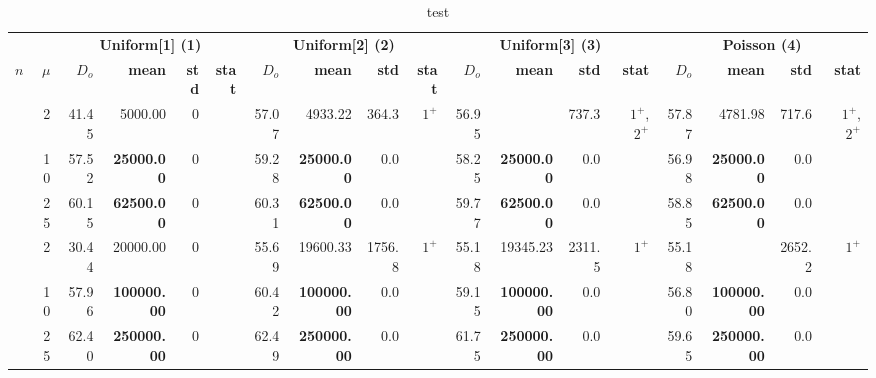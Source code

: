 \begin{table}

\caption{test}
\centering
\begin{tabular}[t]{rrrrrrrrrrrrrrrrrr}
\toprule
\multicolumn{1}{c}{\textbf{ }} & \multicolumn{1}{c}{\textbf{ }} & \multicolumn{4}{c}{\textbf{Uniform[1] (1)}} & \multicolumn{4}{c}{\textbf{Uniform[2] (2)}} & \multicolumn{4}{c}{\textbf{Uniform[3] (3)}} & \multicolumn{4}{c}{\textbf{Poisson (4)}} \\
\cmidrule(l{3pt}r{3pt}){3-6} \cmidrule(l{3pt}r{3pt}){7-10} \cmidrule(l{3pt}r{3pt}){11-14} \cmidrule(l{3pt}r{3pt}){15-18}
$n$ & $\mu$ & $D_o$ & \textbf{mean} & \textbf{std} & \textbf{stat} & $D_o$ & \textbf{mean} & \textbf{std} & \textbf{stat} & $D_o$ & \textbf{mean} & \textbf{std} & \textbf{stat} & $D_o$ & \textbf{mean} & \textbf{std} & \textbf{stat}\\
\midrule
 & 2 & 41.45 & 5000.00 & 0 &  & 57.07 & 4933.22 & 364.3 & \textcolor{uniform1}{$\text{1}^{+}$} & 56.95 & \cellcolor{gray!20}{\textbf{4778.68}} & 737.3 & \textcolor{uniform1}{$\text{1}^{+}$}, \textcolor{uniform2}{$\text{2}^{+}$} & 57.87 & 4781.98 & 717.6 & \textcolor{uniform1}{$\text{1}^{+}$}, \textcolor{uniform2}{$\text{2}^{+}$}\\

 & 10 & 57.52 & \textbf{25000.00} & 0 &  & 59.28 & \textbf{25000.00} & 0.0 &  & 58.25 & \textbf{25000.00} & 0.0 &  & 56.98 & \textbf{25000.00} & 0.0 & \\

\multirow{-3}{*}{\raggedleft\arraybackslash 50} & 25 & 60.15 & \textbf{62500.00} & 0 &  & 60.31 & \textbf{62500.00} & 0.0 &  & 59.77 & \textbf{62500.00} & 0.0 &  & 58.85 & \textbf{62500.00} & 0.0 & \\
\cmidrule{1-18}
 & 2 & 30.44 & 20000.00 & 0 &  & 55.69 & 19600.33 & 1756.8 & \textcolor{uniform1}{$\text{1}^{+}$} & 55.18 & 19345.23 & 2311.5 & \textcolor{uniform1}{$\text{1}^{+}$} & 55.18 & \cellcolor{gray!20}{\textbf{19271.33}} & 2652.2 & \textcolor{uniform1}{$\text{1}^{+}$}\\

 & 10 & 57.96 & \textbf{100000.00} & 0 &  & 60.42 & \textbf{100000.00} & 0.0 &  & 59.15 & \textbf{100000.00} & 0.0 &  & 56.80 & \textbf{100000.00} & 0.0 & \\

 & 25 & 62.40 & \textbf{250000.00} & 0 &  & 62.49 & \textbf{250000.00} & 0.0 &  & 61.75 & \textbf{250000.00} & 0.0 &  & 59.65 & \textbf{250000.00} & 0.0 & \\


\end{tabular}
\end{table}
